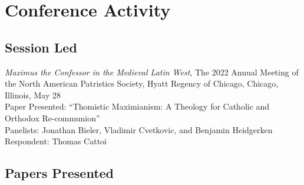\documentclass[letterpaper,12pt]{article}
\newcommand{\years}[1]{%
  {\reversemarginpar\strut\marginnote{{\small#1}}}%
}
\begin{document}
{{{{{{{%
\section*{Conference Activity}

\subsection*{Session Led}

\years{2022}%
%
\emph{Maximus the Confessor in the Medieval Latin West}, The 2022 Annual Meeting of the North American Patristics Society, Hyatt Regency of Chicago, Chicago, Illinois, May 28\\
Paper Presented: ``Thomistic Maximianism: A Theology for Catholic and Orthodox Re-communion'' \\
Panelists: Jonathan Bieler, Vladimir Cvetkovic, and Benjamin Heidgerken \\
Respondent: Thomas Cattoi

\subsection*{Papers Presented}

}}}}}}}
\end{document}
